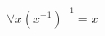 \documentclass[preview]{standalone}
\begin{document}
\begin{align*}
\forall x (x^{-1})^{-1} = x
\end{align*}
\end{document}
